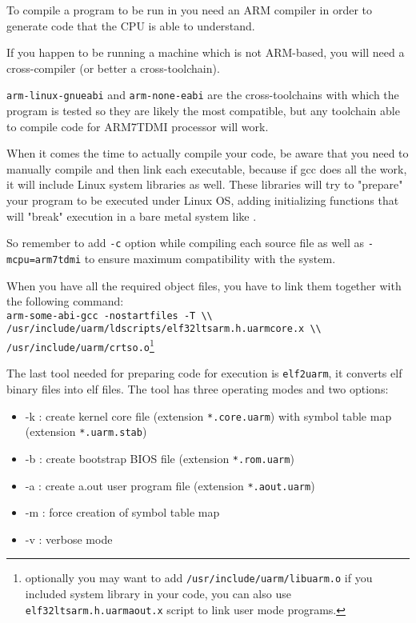 


To compile a program to be run in \uarm{} you need an ARM compiler in order to generate code that the CPU is able to understand.

If you happen to be running a machine which is not ARM-based, you will need a cross-compiler (or better a cross-toolchain).

\texttt{arm-linux-gnueabi} and \texttt{arm-none-eabi} are the cross-toolchains with which the program is tested so they are likely the most compatible, but any toolchain able to compile code for ARM7TDMI processor will work.


When it comes the time to actually compile your code, be aware that you need to manually compile and then link each executable, because if gcc does all the work, it will include Linux system libraries as well. These libraries will try to "prepare" your program to be executed under Linux OS, adding initializing functions that will "break" execution in a bare metal system like \uarm{}.

So remember to add \texttt{-c} option while compiling each source file as well as \texttt{-mcpu=arm7tdmi} to ensure maximum compatibility with the system.

When you have all the required object files, you have to link them together with the following command: \\ \texttt{arm-some-abi-gcc -nostartfiles -T \textbackslash\textbackslash \\ /usr/include/uarm/ldscripts/elf32ltsarm.h.uarmcore.x \textbackslash\textbackslash \\ /usr/include/uarm/crtso.o}\footnote{optionally you may want to add \texttt{/usr/include/uarm/libuarm.o} if you included system library in your code, you can also use \texttt{elf32ltsarm.h.uarmaout.x} script to link user mode programs.}

The last tool needed for preparing code for execution is \texttt{elf2uarm}, it converts elf binary files into \uarm{} elf files. The tool has three operating modes and two options:

\begin{itemize}
\item -k : create kernel core file (extension \texttt{*.core.uarm}) with symbol table map (extension \texttt{*.uarm.stab})
\item -b : create bootstrap BIOS file (extension \texttt{*.rom.uarm})
\item -a : create a.out user program file (extension \texttt{*.aout.uarm})
\\
\item -m : force creation of symbol table map
\item -v : verbose mode
\end{itemize}

